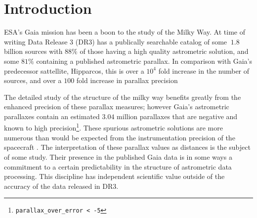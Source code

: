 \documentclass[preprint2]{aastex631}
\begin{document}

\section{Introduction} \label{sec:intro}


ESA's Gaia mission has been a boon to the study of the Milky Way. At time of writing Data Release 3 (DR3) has a publically searchable catalog of some $~1.8$ billion sources with $88\%$ of those having a high quality astrometric solution, and some $81\%$ containing a published astrometric parallax. In comparison with Gaia's predecessor sattellite, Hipparcos, this is over a $10^4$ fold increase in the number of sources, and over a $100$ fold increase in parallax precision \cite{perrymanHistory2012}

The detailed study of the structure of the milky way benefits greatly from the enhanced precision of these parallax measures; however Gaia's astrometric parallaxes contain an estimated $3.04$ million parallaxes that are negative and known to high precision\footnote{\texttt{parallax\_over\_error < -5}}. These spurious astrometric solutions are more numerous than would be expected from the instrumentation precision of the spacecraft \cite{fabriciusGaia2021}. The interpretation of these parallax values as distances is the subject of some study. Their presence in the published Gaia data is in some ways a commitment to a certain predictability in the structure of astrometric data processing. This discipline has independent scientific value outside of the accuracy of the data released in DR3.
\end{document}
